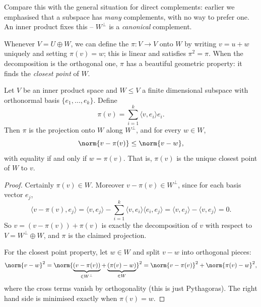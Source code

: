 Compare this with the general situation for direct complements: earlier we emphasised that a subspace has \emph{many} complements, with no way to prefer one. An inner product fixes this -- $W^\perp$ is a \emph{canonical} complement.

Whenever $V = U \oplus W$, we can define the  $\pi: V \rightarrow V$ onto $W$ by writing $v = u + w$ uniquely and setting $\pi(v) = w$; this is linear and satisfies $\pi^2 = \pi$. When the decomposition is the orthogonal one, $\pi$ has a beautiful geometric property: it finds the \emph{closest point} of $W$.

\begin{center}
\end{center}

\begin{proposition}
    Let $V$ be an inner product space and $W \leq V$ a finite dimensional subspace with orthonormal basis $\{e_1, \dots, e_k\}$. Define
    $$
    \pi(v) = \sum_{i = 1}^k \langle v, e_i \rangle e_i.
    $$
    Then $\pi$ is the projection onto $W$ along $W^\perp$, and for every $w \in W$,
    $$
    \norm{v - \pi(v)} \leq \norm{v - w},
    $$
    with equality if and only if $w = \pi(v)$. That is, $\pi(v)$ is the unique closest point of $W$ to $v$.
\end{proposition}
\begin{proof}
    Certainly $\pi(v) \in W$. Moreover $v - \pi(v) \in W^\perp$, since for each basis vector $e_j$,
    $$
    \langle v - \pi(v), e_j \rangle = \langle v, e_j \rangle - \sum_{i = 1}^k \langle v, e_i \rangle \langle e_i, e_j \rangle = \langle v, e_j\rangle - \langle v, e_j \rangle = 0.
    $$
    So $v = (v - \pi(v)) + \pi(v)$ is exactly the decomposition of $v$ with respect to $V = W^\perp \oplus W$, and $\pi$ is the claimed projection.

    For the closest point property, let $w \in W$ and split $v - w$ into orthogonal pieces:
    $$
    \norm{v - w}^2 = \norm{\underbrace{(v - \pi(v))}_{\in W^\perp} + \underbrace{(\pi(v) - w)}_{\in W}}^2 = \norm{v - \pi(v)}^2 + \norm{\pi(v) - w}^2,
    $$
    where the cross terms vanish by orthogonality (this is just Pythagoras). The right hand side is minimised exactly when $\pi(v) = w$.
\end{proof}

